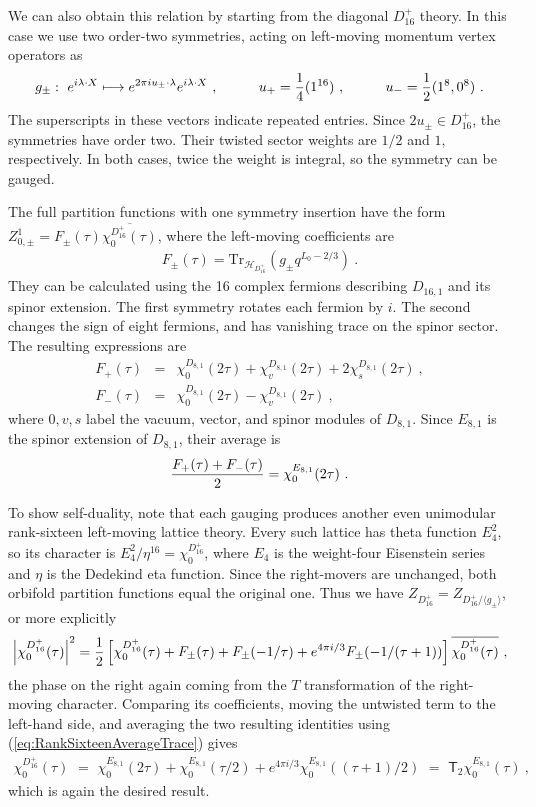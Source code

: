 \documentclass[12pt]{article}
\numberwithin{equation}{section}
\newcommand{\bea}{\begin{eqnarray}}
\newcommand{\eea}{\end{eqnarray}}
\def\no{\nonumber}
\def\cH{\mathcal{H}}
\newcommand{\Tr}{\mathrm{Tr}}
\theoremstyle{remark}
\begin{document}
We can also obtain this relation by starting from the diagonal $D_{16}^{+}$ theory. In this case we use two order-two symmetries, acting on left-moving momentum vertex operators as
\bea
g_\pm:\,\,e^{i\lambda\cdot X}\longmapsto e^{2\pi i u_\pm\cdot\lambda}e^{i\lambda\cdot X}~, \hspace{0.4 in}u_+={1\over 4}(1^{16})~,\hspace{0.4 in}u_-={1\over 2}(1^8,0^8)~.
\eea
The superscripts in these vectors indicate repeated entries. Since $2u_\pm\in D_{16}^{+}$, the symmetries have order two. Their twisted sector weights are $1/2$ and $1$, respectively. In both cases, twice the weight is integral, so the symmetry can be gauged.

The full partition functions with one symmetry insertion have the form $Z^1_{0,\pm}=F_\pm(\tau)\overline{\chi^{D_{16}^{+}}_0(\tau)}$, where the left-moving coefficients are
\bea
F_\pm(\tau)=\Tr_{\cH_{D_{16}^{+}}}\!\left(g_\pm q^{L_0-2/3}\right)~.
\eea
They can be calculated using the 16 complex fermions describing $D_{16,1}$ and its spinor extension. The first symmetry rotates each fermion by $i$. The second changes the sign of eight fermions, and has vanishing trace on the spinor sector. The resulting expressions are
\bea
F_+(\tau)&=&\chi^{D_{8,1}}_0(2\tau)+\chi^{D_{8,1}}_v(2\tau)+2\chi^{D_{8,1}}_s(2\tau)~,\no\\
F_-(\tau)&=&\chi^{D_{8,1}}_0(2\tau)-\chi^{D_{8,1}}_v(2\tau)~,
\eea
where $0,v,s$ label the vacuum, vector, and spinor modules of $D_{8,1}$. Since $E_{8,1}$ is the spinor extension of $D_{8,1}$, their average is
\bea \label{eq:RankSixteenAverageTrace}
{F_+(\tau)+F_-(\tau)\over2}=\chi^{E_{8,1}}_0(2\tau)~.
\eea

To show self-duality, note that each gauging produces another even unimodular rank-sixteen left-moving lattice theory. Every such lattice has theta function $E_4^2$, so its character is $E_4^2/\eta^{16}=\chi^{D_{16}^{+}}_0$, where $E_4$ is the weight-four Eisenstein series and $\eta$ is the Dedekind eta function. Since the right-movers are unchanged, both orbifold partition functions equal the original one. Thus we have $Z_{D_{16}^{+}} = Z_{D_{16}^{+}/\langle g_\pm\rangle}$, or more explicitly
\bea
\left|\chi^{D_{16}^{+}}_0(\tau)\right|^2={1\over2}\left[\chi^{D_{16}^{+}}_0(\tau)+F_\pm(\tau)+F_\pm(-1/\tau)+e^{4\pi i/3}F_\pm(-1/(\tau+1))\right]\overline{\chi^{D_{16}^{+}}_0(\tau)}~,
\eea
the phase on the right again coming from the $T$ transformation of the right-moving character. Comparing its coefficients, moving the untwisted term to the left-hand side, and averaging the two resulting identities using (\ref{eq:RankSixteenAverageTrace}) gives
\bea
\chi^{D_{16}^{+}}_0(\tau)\,\,=\,\,\chi^{E_{8,1}}_0(2\tau)+\chi^{E_{8,1}}_0(\tau/2)+e^{4\pi i/3}\chi^{E_{8,1}}_0((\tau+1)/2) \,\,=\,\,\mathsf T_2\chi^{E_{8,1}}_0(\tau)~,
\eea
which is again the desired result.
\end{document}
